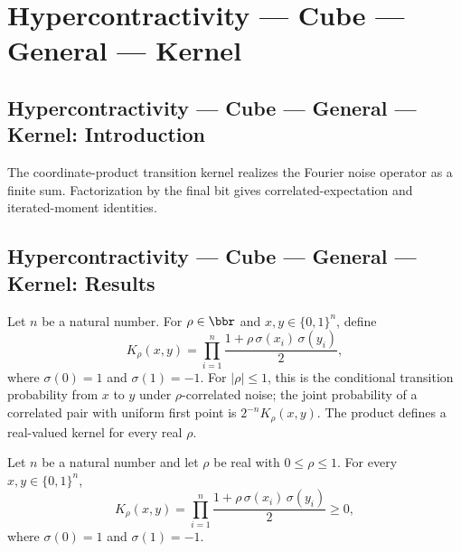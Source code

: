 \section{Hypercontractivity --- Cube --- General --- Kernel}
\subsection*{Hypercontractivity --- Cube --- General --- Kernel: Introduction}
The coordinate-product transition kernel realizes the Fourier noise operator as a finite sum. Factorization by the final bit gives correlated-expectation and iterated-moment identities.

\subsection*{Hypercontractivity --- Cube --- General --- Kernel: Results}

\begin{definition}
\leanok
{}
\label{BooleanAnalysis.Hypercontractivity.noiseKernel}
Let $n$ be a natural number. For $\rho \in \bbr$ and $x,y\in\{0,1\}^n$, define
\[
  K_\rho(x,y)=\prod_{i=1}^{n}\frac{1+\rho\,\sigma(x_i)\,\sigma(y_i)}{2},
\]
where $\sigma(0)=1$ and $\sigma(1)=-1$. For $|\rho|\le1$, this is the conditional
transition probability from $x$ to $y$ under $\rho$-correlated noise; the joint
probability of a correlated pair with uniform first point is $2^{-n}K_\rho(x,y)$.
The product defines a real-valued kernel for every real $\rho$.
\end{definition}

\begin{lemma}
\leanok
{}
\label{BooleanAnalysis.Hypercontractivity.noiseKernel_nonneg}
Let $n$ be a natural number and let $\rho$ be real with $0\le\rho\le1$.
For every $x,y\in\{0,1\}^n$,
\[
  K_\rho(x,y)=\prod_{i=1}^{n}\frac{1+\rho\,\sigma(x_i)\,\sigma(y_i)}{2}\ge0,
\]
where $\sigma(0)=1$ and $\sigma(1)=-1$.
\end{lemma}

